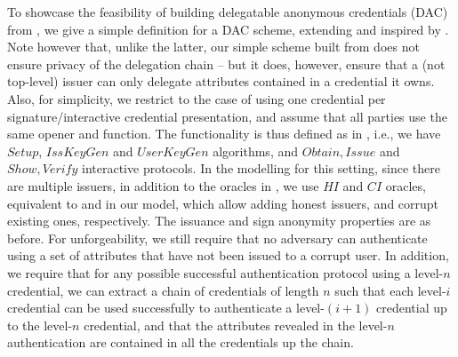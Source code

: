To showcase the feasibility of building delegatable anonymous credentials (DAC)
from \UAS, we give a simple definition for a DAC scheme, extending
\cite{fhs19} and inspired by \cite{bcc+09}. Note however that, unlike the
latter, our simple scheme built from \CUASGen does not ensure privacy of the
delegation chain -- but it does, however, ensure that a (not top-level) issuer
can only delegate attributes contained in a credential it owns. Also, for
simplicity, we restrict to the case of using one credential per
signature/interactive credential presentation, and assume that all parties use
the same opener and \finsp function.
%
The functionality is thus defined as in , i.e.,
we have $Setup$, $IssKeyGen$ and $UserKeyGen$ algorithms, and $Obtain,Issue$ and
$Show,Verify$ interactive protocols.
%
In the modelling for this setting, since there are multiple issuers, in addition
to the oracles in , we use $HI$ and $CI$ oracles,
equivalent to \IGEN and \ICORR in our \UAS model, which allow adding honest
issuers, and corrupt existing ones, respectively. The issuance and sign
anonymity properties are as before. For unforgeability, we still require
that no adversary can authenticate using a set of attributes that have not been
issued to a corrupt user. In addition, we require that for any possible
successful authentication protocol using a level-$n$ credential, we can extract
a chain of credentials of length $n$ such that each level-$i$ credential can
be used successfully to authenticate a level-$(i+1)$ credential up to the
level-$n$ credential, and that the attributes revealed in the level-$n$
authentication are contained in all the credentials up the chain.



